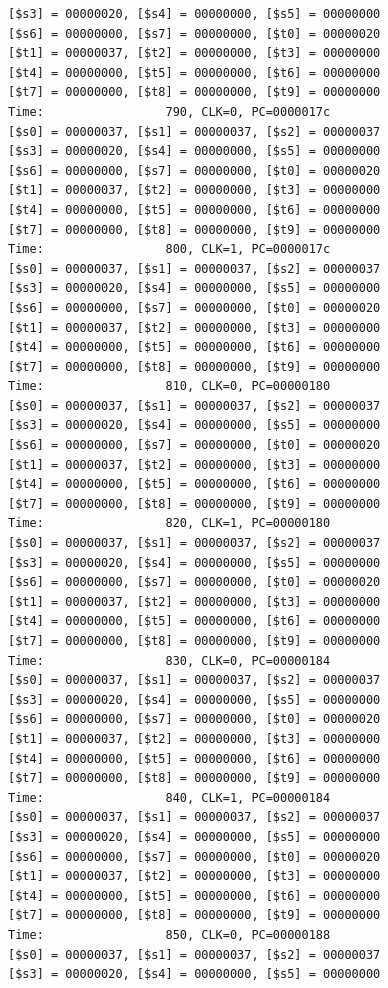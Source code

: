 \documentclass[a4paper,12pt]{article}
\begin{document}
\begin{lstlisting}
[$s3] = 00000020, [$s4] = 00000000, [$s5] = 00000000
[$s6] = 00000000, [$s7] = 00000000, [$t0] = 00000020
[$t1] = 00000037, [$t2] = 00000000, [$t3] = 00000000
[$t4] = 00000000, [$t5] = 00000000, [$t6] = 00000000
[$t7] = 00000000, [$t8] = 00000000, [$t9] = 00000000
Time:                 790, CLK=0, PC=0000017c
[$s0] = 00000037, [$s1] = 00000037, [$s2] = 00000037
[$s3] = 00000020, [$s4] = 00000000, [$s5] = 00000000
[$s6] = 00000000, [$s7] = 00000000, [$t0] = 00000020
[$t1] = 00000037, [$t2] = 00000000, [$t3] = 00000000
[$t4] = 00000000, [$t5] = 00000000, [$t6] = 00000000
[$t7] = 00000000, [$t8] = 00000000, [$t9] = 00000000
Time:                 800, CLK=1, PC=0000017c
[$s0] = 00000037, [$s1] = 00000037, [$s2] = 00000037
[$s3] = 00000020, [$s4] = 00000000, [$s5] = 00000000
[$s6] = 00000000, [$s7] = 00000000, [$t0] = 00000020
[$t1] = 00000037, [$t2] = 00000000, [$t3] = 00000000
[$t4] = 00000000, [$t5] = 00000000, [$t6] = 00000000
[$t7] = 00000000, [$t8] = 00000000, [$t9] = 00000000
Time:                 810, CLK=0, PC=00000180
[$s0] = 00000037, [$s1] = 00000037, [$s2] = 00000037
[$s3] = 00000020, [$s4] = 00000000, [$s5] = 00000000
[$s6] = 00000000, [$s7] = 00000000, [$t0] = 00000020
[$t1] = 00000037, [$t2] = 00000000, [$t3] = 00000000
[$t4] = 00000000, [$t5] = 00000000, [$t6] = 00000000
[$t7] = 00000000, [$t8] = 00000000, [$t9] = 00000000
Time:                 820, CLK=1, PC=00000180
[$s0] = 00000037, [$s1] = 00000037, [$s2] = 00000037
[$s3] = 00000020, [$s4] = 00000000, [$s5] = 00000000
[$s6] = 00000000, [$s7] = 00000000, [$t0] = 00000020
[$t1] = 00000037, [$t2] = 00000000, [$t3] = 00000000
[$t4] = 00000000, [$t5] = 00000000, [$t6] = 00000000
[$t7] = 00000000, [$t8] = 00000000, [$t9] = 00000000
Time:                 830, CLK=0, PC=00000184
[$s0] = 00000037, [$s1] = 00000037, [$s2] = 00000037
[$s3] = 00000020, [$s4] = 00000000, [$s5] = 00000000
[$s6] = 00000000, [$s7] = 00000000, [$t0] = 00000020
[$t1] = 00000037, [$t2] = 00000000, [$t3] = 00000000
[$t4] = 00000000, [$t5] = 00000000, [$t6] = 00000000
[$t7] = 00000000, [$t8] = 00000000, [$t9] = 00000000
Time:                 840, CLK=1, PC=00000184
[$s0] = 00000037, [$s1] = 00000037, [$s2] = 00000037
[$s3] = 00000020, [$s4] = 00000000, [$s5] = 00000000
[$s6] = 00000000, [$s7] = 00000000, [$t0] = 00000020
[$t1] = 00000037, [$t2] = 00000000, [$t3] = 00000000
[$t4] = 00000000, [$t5] = 00000000, [$t6] = 00000000
[$t7] = 00000000, [$t8] = 00000000, [$t9] = 00000000
Time:                 850, CLK=0, PC=00000188
[$s0] = 00000037, [$s1] = 00000037, [$s2] = 00000037
[$s3] = 00000020, [$s4] = 00000000, [$s5] = 00000000

\end{lstlisting}
\end{document}
